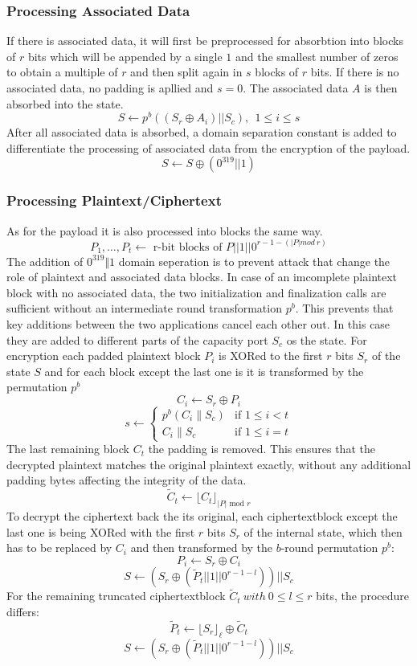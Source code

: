 \subsubsection{Processing Associated Data}
If there is associated data, it will first be preprocessed for absorbtion into blocks of $r$ bits which will be appended by a single $1$ and the smallest number of zeros to obtain a multiple of $r$ and then split again in $s$ blocks of $r$ bits. If there is no associated data, no padding is apllied and $s=0$.
\sloppy
The associated data $A$ is then absorbed into the state.
\[
S \leftarrow p^b((S_r \oplus A_i) || S_c),\ \ 1 \leq i \leq s
\]
After all associated data is absorbed, a domain separation constant is added to differentiate the processing of associated data from the encryption of the payload. \cite[Chapter 2.4.2]{Ascon-v1.2}
$$S \leftarrow S \oplus (0^{319} || 1)$$

\subsubsection{Processing Plaintext/Ciphertext}
As for the payload it is also processed into blocks the same way. 
$$P_1, \dots , P_t \leftarrow \text{ r-bit blocks of } P || 1 || 0^{r-1-(|P| mod\ r)}$$
The addition of $0^{319} \Vert 1$ domain seperation is to prevent attack that change the role of plaintext and associated data blocks. In case of an imcomplete plaintext block with no associated data, the two initialization and finalization calls are sufficient without an intermediate round transformation $p^b$. This prevents that key additions between the two applications cancel each other out. In this case they are added to different parts of the capacity port $S_c$ os the state. \cite[Chapter 5.1.1]{Ascon-v1.2} \newline
For encryption each padded plaintext block $P_i$ is XORed to the first $r$ bits $S_r$ of the state $S$ and for each block except the last one is it is transformed by the permutation $p^b$%
$$C_i \leftarrow S_r \oplus P_i$$
$$
s \leftarrow \begin{cases} 
    p^b(C_i \parallel S_c) & \text{if } 1 \leq i < t \\
    C_i \parallel S_c & \text{if } 1 \leq i = t
    \end{cases}
$$
The last remaining block $C_t$ the padding is removed. This ensures that the decrypted plaintext matches the original plaintext exactly, without any additional padding bytes affecting the integrity of the data.
$$\tilde{C}_t \leftarrow \lfloor C_t \rfloor_{|P| \text{ mod } r}$$
\newline
To decrypt the ciphertext back the its original, each ciphertextblock except the last one is being XORed with the first $r$ bits $S_r$ of the internal state, which then has to be replaced by $C_i$ and then transformed by the $b$-round permutation $p^b$:
$$ P_i\leftarrow S_r \oplus C_i $$
$$ S \leftarrow (S_r \oplus (\tilde P_t || 1 || 0^{r-1-l})) || S_c $$
For the remaining truncated ciphertextblock $\tilde C_t\ with\ 0 \leq l \le r$ bits, the procedure differs:
$$\tilde{P}_t \leftarrow \lfloor S_r \rfloor_\ell \oplus \tilde{C}_t$$
$$S \leftarrow (S_r \oplus (\tilde P_t || 1 || 0^{r-1-l})) || S_c$$
\cite{Ascon-v1.2}
